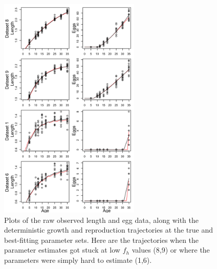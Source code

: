 \documentclass[12pt,reqno,final,pdftex]{amsart}\usepackage[]{graphicx}\usepackage[]{color}
\newenvironment{knitrout}{}{} %
\theoremstyle{plain}
\numberwithin{equation}{part}
\begin{document}
\begin{knitrout}\scriptsize
{}\color{fgcolor}\begin{figure}

\includegraphics[width=0.6\textwidth]{figure/unnamed-chunk-7-1} \hfill{}

\caption[Plots of the raw observed length and egg data, along with the deterministic growth and reproduction trajectories at the true and best-fitting parameter sets]{Plots of the raw observed length and egg data, along with the deterministic growth and reproduction trajectories at the true and best-fitting parameter sets. Here are the trajectories when the parameter estimates got stuck at low $f_h$ values (8,9) or where the parameters were simply hard to estimate (1,6).}\label{fig:unnamed-chunk-7}
\end{figure}


\end{knitrout}
\end{document}
